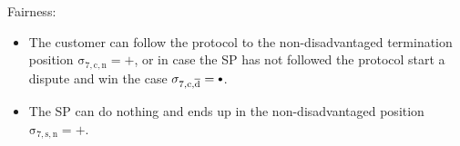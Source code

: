 \documentclass{ieeeaccess}
\newcommand\neutral[1][.75]{\mathbin{\ThisStyle{\vcenter{\hbox{%
  \scalebox{#1}{$\SavedStyle\bullet$}}}}}%
}
\begin{document}
Fairness:

\begin{itemize}

\item
  The customer can follow the protocol to the non-disadvantaged termination position \(\operatorname{\sigma_{7, c, n} = +}\), or in case the SP has not followed the protocol start a dispute and win the case \(\operatorname{\sigma_{7, c, \overline{d}} = \neutral}\).
\item
  The SP can do nothing and ends up in the non-disadvantaged position \(\operatorname{\sigma_{7, s, n} = +}\).
\end{itemize}



% 






\end{document}
